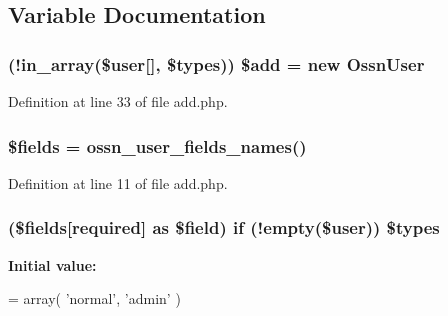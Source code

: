 \subsection{Variable Documentation}
\subsubsection[{\texorpdfstring{\$add}{$add}}]{ (!in\+\_\+array(\${\bf user}\mbox{[}\textquotesingle{}\mbox{]}, \${\bf types})) \${\bf add} = new {\bf Ossn\+User}}\hypertarget{actions_2administrator_2user_2add_8php_afd7971701575bc01a19ce0071eb99a8f}{}\label{actions_2administrator_2user_2add_8php_afd7971701575bc01a19ce0071eb99a8f}


Definition at line 33 of file add.\+php.

\subsubsection[{\texorpdfstring{\$fields}{$fields}}]{\setlength{\rightskip}{0pt plus 5cm}\$fields = {\bf ossn\+\_\+user\+\_\+fields\+\_\+names}()}\hypertarget{actions_2administrator_2user_2add_8php_ab2303c817e3b402b77b7f99627b9c319}{}\label{actions_2administrator_2user_2add_8php_ab2303c817e3b402b77b7f99627b9c319}


Definition at line 11 of file add.\+php.

\subsubsection[{\texorpdfstring{\$types}{$types}}]{ (\$fields\mbox{[}\textquotesingle{}required\textquotesingle{}\mbox{]} as \$field) {\bf if} (!empty(\${\bf user})) \${\bf types}}\hypertarget{actions_2administrator_2user_2add_8php_ab28590d1bf5635b05cef8ea2e8e71b7f}{}\label{actions_2administrator_2user_2add_8php_ab28590d1bf5635b05cef8ea2e8e71b7f}
{\bfseries Initial value\+:}
\begin{DoxyCode}
= array(
    \textcolor{stringliteral}{'normal'},
    \textcolor{stringliteral}{'admin'}
)
\end{DoxyCode}


